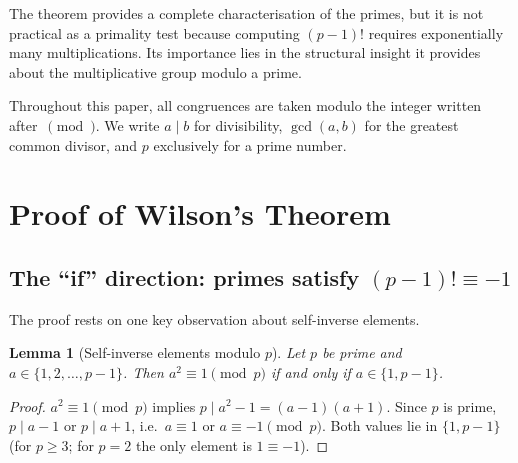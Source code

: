 \documentclass[12pt,a4paper]{amsart}
\newtheorem{lemma}[theorem]{Lemma}
\theoremstyle{definition}
\begin{document}
The theorem provides a complete characterisation of the primes,
but it is not practical as a primality test because computing $(p-1)!$ requires
exponentially many multiplications.
Its importance lies in the structural insight it provides about the
multiplicative group modulo a prime.

Throughout this paper, all congruences are taken modulo the integer written
after~$\pmod{}$.  We write $a \mid b$ for divisibility, $\gcd(a,b)$ for the
greatest common divisor, and $p$ exclusively for a prime number.

\section{Proof of Wilson's Theorem}

\subsection{The ``if'' direction: primes satisfy $(p-1)!\equiv -1$}

The proof rests on one key observation about self-inverse elements.

\begin{lemma}[Self-inverse elements modulo $p$]\label{lem:selfinverse}
  Let $p$ be prime and $a \in \{1,2,\ldots,p-1\}$.
  Then $a^2 \equiv 1 \pmod{p}$ if and only if $a \in \{1, p-1\}$.
\end{lemma}

\begin{proof}
  $a^2 \equiv 1 \pmod p$ implies $p \mid a^2 - 1 = (a-1)(a+1)$.
  Since $p$ is prime, $p \mid a-1$ or $p \mid a+1$,
  i.e.\ $a \equiv 1$ or $a \equiv -1 \pmod p$.
  Both values lie in $\{1, p-1\}$ (for $p \geq 3$; for $p=2$ the only
  element is $1 \equiv -1$).
\end{proof}
\end{document}
